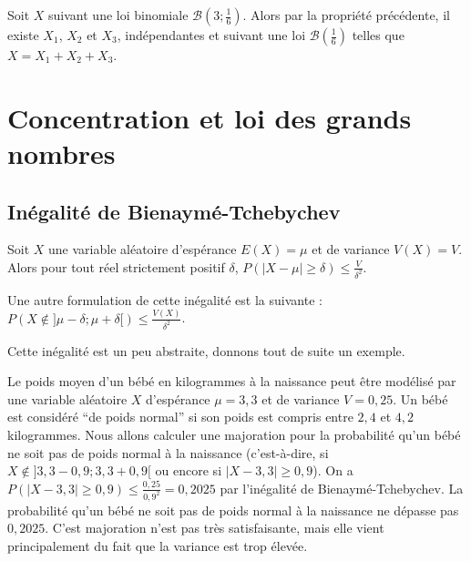 	\begin{tip}[Exemple]
		Soit $X$ suivant une loi binomiale $\mathcal{B}\left(3; \frac{1}{6}\right)$. Alors par la propriété précédente, il existe $X_1$, $X_2$ et $X_3$, indépendantes et suivant une loi $\mathcal{B}\left(\frac{1}{6}\right)$ telles que $X = X_1 + X_2 + X_3$.
	\end{tip}

	\section{Concentration et loi des grands nombres}

	\subsection{Inégalité de Bienaymé-Tchebychev}

	\begin{formula}
		Soit $X$ une variable aléatoire d'espérance $E(X) = \mu$ et de variance $V(X) = V$. Alors pour tout réel strictement positif $\delta$, $P(|X-\mu| \geq \delta) \leq \frac{V}{\delta^2}$.
	\end{formula}

	\begin{tip}
		Une autre formulation de cette inégalité est la suivante : $P(X \notin ]\mu - \delta; \mu + \delta[) \leq \frac{V(X)}{\delta^2}$.
	\end{tip}

	\begin{nosummary}
		Cette inégalité est un peu abstraite, donnons tout de suite un exemple.

		\begin{tip}[Exemple]
			Le poids moyen d'un bébé en kilogrammes à la naissance peut être modélisé par une variable aléatoire $X$ d'espérance $\mu = 3,3$ et de variance $V = 0,25$.
			\newpar
			Un bébé est considéré ``de poids normal'' si son poids est compris entre $2,4$ et $4,2$ kilogrammes. Nous allons calculer une majoration pour la probabilité qu'un bébé ne soit pas de poids normal à la naissance (c'est-à-dire, si $X \notin ]3,3 - 0,9; 3,3 + 0,9[$ ou encore si $|X - 3,3| \geq 0,9$).
			\newpar
			On a $P(|X - 3,3| \geq 0,9) \leq \frac{0,25}{0,9^2} = 0,2025$ par l'inégalité de Bienaymé-Tchebychev.
			\newpar
			La probabilité qu'un bébé ne soit pas de poids normal à la naissance ne dépasse pas $0,2025$.
			\newpar
			C'est majoration n'est pas très satisfaisante, mais elle vient principalement du fait que la variance est trop élevée.
		\end{tip}
	\end{nosummary}

